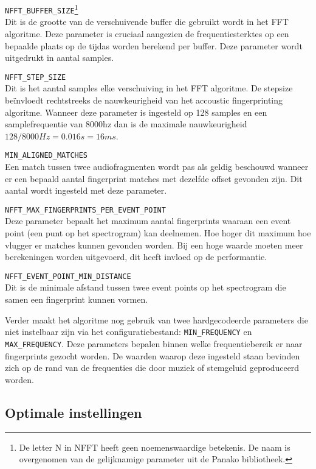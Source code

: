 \begin{description}
\item\texttt{NFFT\_BUFFER\_SIZE}\footnote{De letter N in NFFT heeft geen noemenswaardige betekenis. De naam is overgenomen van de gelijknamige parameter uit de Panako bibliotheek.} \hfill \\
Dit is de grootte van de verschuivende buffer die gebruikt wordt in het FFT algoritme. Deze parameter is cruciaal aangezien de frequentiesterktes op een bepaalde plaats op de tijd\-as worden berekend per buffer. Deze parameter wordt uitgedrukt in aantal samples.
\item\texttt{NFFT\_STEP\_SIZE} \hfill \\
Dit is het aantal samples elke verschuiving in het FFT algoritme. De stepsize beïnvloedt rechtstreeks de nauwkeurigheid van het accoustic fingerprinting algoritme. Wanneer deze parameter is ingesteld op 128 samples en een samplefrequentie van 8000hz dan is de maximale nauwkeurigheid $128/8000Hz = 0.016s = 16ms$.
\item\texttt{MIN\_ALIGNED\_MATCHES} \hfill \\
Een match tussen twee audiofragmenten wordt pas als geldig beschouwd wanneer er een bepaald aantal fingerprint matches met dezelfde offset gevonden zijn. Dit aantal wordt ingesteld met deze parameter.
\item\texttt{NFFT\_MAX\_FINGERPRINTS\_PER\_EVENT\_POINT} \hfill \\
Deze parameter bepaalt het maximum aantal fingerprints waaraan een event point (een punt op het spectrogram) kan deelnemen. Hoe hoger dit maximum hoe vlugger er matches kunnen gevonden worden. Bij een hoge waarde moeten meer berekeningen worden uitgevoerd, dit heeft invloed op de performantie.
\item\texttt{NFFT\_EVENT\_POINT\_MIN\_DISTANCE} \hfill \\
Dit is de minimale afstand tussen twee event points op het spectrogram die samen een fingerprint kunnen vormen. 

\end{description}

Verder maakt het algoritme nog gebruik van twee hardgecodeerde parameters die niet instelbaar zijn via het configuratiebestand: \texttt{MIN\_FREQUENCY} en \texttt{MAX\_FREQUENCY}. Deze parameters bepalen binnen welke frequentiebereik er naar fingerprints gezocht worden. De waarden waarop deze ingesteld staan bevinden zich op de rand van de frequenties die door muziek of stemgeluid geproduceerd worden.

\subsection{Optimale instellingen}
\label{optimal-accoustic-fingerprinting}

